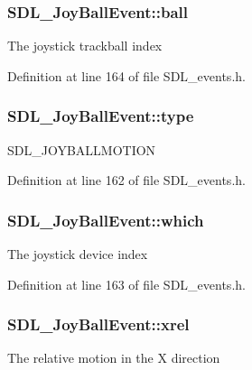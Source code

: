 \subsubsection[{ball}]{ S\+D\+L\+\_\+\+Joy\+Ball\+Event\+::ball}\label{struct_s_d_l___joy_ball_event_add4eb0daeaf95ae56e8c7cfcec560242}
The joystick trackball index 

Definition at line 164 of file S\+D\+L\+\_\+events.\+h.

\hypertarget{struct_s_d_l___joy_ball_event_aa2c2e84ae1814f280dcc4ec37feb8ce3}{}
\subsubsection[{type}]{ S\+D\+L\+\_\+\+Joy\+Ball\+Event\+::type}\label{struct_s_d_l___joy_ball_event_aa2c2e84ae1814f280dcc4ec37feb8ce3}
S\+D\+L\+\_\+\+J\+O\+Y\+B\+A\+L\+L\+M\+O\+T\+I\+O\+N 

Definition at line 162 of file S\+D\+L\+\_\+events.\+h.

\hypertarget{struct_s_d_l___joy_ball_event_ae23a3dc77c0f327ec3597e68a4fa02ab}{}
\subsubsection[{which}]{ S\+D\+L\+\_\+\+Joy\+Ball\+Event\+::which}\label{struct_s_d_l___joy_ball_event_ae23a3dc77c0f327ec3597e68a4fa02ab}
The joystick device index 

Definition at line 163 of file S\+D\+L\+\_\+events.\+h.

\hypertarget{struct_s_d_l___joy_ball_event_a959a8473aa1964e5e1778c27a9ffd261}{}
\subsubsection[{xrel}]{ S\+D\+L\+\_\+\+Joy\+Ball\+Event\+::xrel}\label{struct_s_d_l___joy_ball_event_a959a8473aa1964e5e1778c27a9ffd261}
The relative motion in the X direction 


